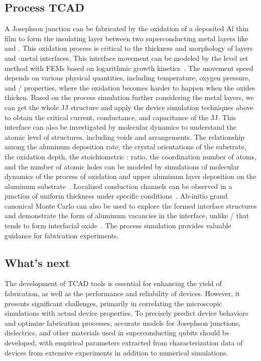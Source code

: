 \documentclass[a4paper,onecolumn,11pt,unpublished]{quantumarticle}
\begin{document}
\subsection{Process TCAD}
A Josephson junction can be fabricated by the oxidation of a deposited Al thin film to form the insulating  layer between two superconducting metal layers like  and . This oxidation process is critical to the thickness and  morphology of  layers and -metal interfaces. This interface movement can be modeled by the level set method with FEMs based on logarithmic growth kinetics~\cite{Weingartner2021Modeling}. The movement speed depends on various physical quantities, including temperature, oxygen pressure, and / properties, where the oxidation becomes harder to happen when the oxides thicken. Based on the process simulation further considering the metal layers, we can get the whole JJ structure and apply the device simulation techniques above to obtain the critical current, conductance, and capacitance of the JJ. This interface can also be investigated by molecular dynamics to understand the atomic level of structures, including voids and arrangements. The relationship among the aluminum deposition rate, the crystal orientations of the substrate, the oxidation depth, the stoichiometric : ratio, the coordination number of atoms, and the number of atomic holes can be modeled by simulations of molecular dynamics of the process of oxidation and upper aluminum layer deposition on the aluminum substrate~\cite{Cyster2021Simulating, Han2023Computational}. Localized conduction channels can be observed in a junction of uniform thickness under specific conditions~\cite{Cyster2020Effect}.   Ab-initio grand canonical Monte Carlo can also be used to explore the formed interface structures and demonstrate the form of aluminum vacancies in the  interface, unlike / that tends to form interfacial oxide~\cite{Somjit2022Atomic}. The process simulation provides valuable guidance for fabrication experiments.

\subsection{What's next}
The development of TCAD tools is essential for enhancing the yield of fabrication, as well as the performance and reliability of devices. However, it presents significant challenges, primarily in correlating the microscopic simulations with actual device properties. To precisely predict device behaviors and optimize fabrication processes, accurate models for Josephson junctions, dielectrics, and other materials used in superconducting qubits should be developed, with empirical parameters extracted from characterization data of devices from extensive experiments in addition to numerical simulations.
\end{document}
